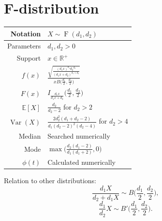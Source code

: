 \documentclass[a4paper,11pt]{article}
\theoremstyle{plain}
\theoremstyle{definition}
\newcommand{\ME}{\mathbb{E}}
\newcommand{\MR}{\mathbb{R}}
\newcommand{\Var}{\operatorname{Var}}
\begin{document}
	
	\pagebreak
	\section{F-distribution}
		\begin{center}
			\begin{tabular}{| r | l |}
				\hline
				Notation & $X \sim \operatorname{F}(d_1, d_2)$ \\
				\hline
				Parameters & $d_1, d_2 > 0$ \\
				\hline
				Support & $x \in \MR^+$  \\
				\hline
				$f(x)$ & $\frac{\sqrt{\frac{(d_1 x)^{d_1} {d_2}^{d_2} }{(d_1x+d_2)^{d_1+d_2}}}}{x B\Big(\frac{d_1}{2},\frac{d_2}{2}\Big)}  $ \\
				\hline
				$F(x)$ & $ I_{\frac{d_1x}{d_1x+d_2}}\Big(\frac{d_1}{2},\frac{d_2}{2}\Big) $\\
				\hline
				$\ME[X]$ & $ \frac{d_2}{d_2-2}$ for $ d_2 > 2 $ \\
				\hline
				$\Var(X)$ & $\frac{2d_2^2(d_1+d_2-2)}{d_1(d_2-2)^2(d_2-4)}$ for $d_2 > 4$ \\
				\hline
				Median & Searched numerically \\
				\hline
				Mode & $\max\Big(\frac{d_2(d_1-2)}{d_1(d_1+2)}, 0\Big)$ \\
				\hline
				$\phi(t)$ & Calculated numerically \\
				\hline
			\end{tabular}
		\end{center}
		Relation to other distributions:
		\[
		\frac{d_1X}{d_2 + d_1X} \sim B\bigg(\frac{d_1}{2}, \frac{d_2}{2} \bigg),
		\]
		\[
		\frac{d_1}{d_2}X \sim B'\bigg(\frac{d_1}{2}, \frac{d_2}{2} \bigg).
		\]
		
		
	\pagebreak
\end{document}
